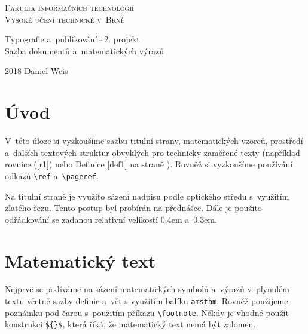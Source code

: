 \documentclass[a4paper, 11pt, twocolumn] {article}
\begin{document}
\begin{titlepage}
\begin{center}

\theoremstyle{definition}
\newtheorem{definition} {Definice}
\newtheorem{sentence}{Věta}



{\Huge \textsc{Fakulta informačních technologií\\[0.4em]
Vysoké učení technické v~Brně}}\\[0.3em]


{\LARGE
	Typografie a~publikování\,--\,2. projekt\\
	Sazba dokumentů a~matematických výrazů\\
}

\end{center}

{\LARGE 2018    \hfill     Daniel Weis}
\end{titlepage}


\section*{Úvod}
V~této úloze si vyzkoušíme sazbu titulní strany, matematic\-kých
vzorců, prostředí a~dalších textových struktur obvyklých
pro technicky zaměřené texty (například rovnice (\ref{r1})
nebo Definice \ref{def1} na straně \pageref{def1}). Rovněž si vyzkoušíme používání
odkazů \verb!\ref! a~\verb!\pageref!.

Na titulní straně je využito sázení nadpisu podle optického
středu s~využitím zlatého řezu. Tento postup byl
probírán na přednášce. Dále je použito odřádkování se
zadanou relativní velikostí 0.4em a~0.3em.


\section{Matematický text}

Nejprve se podíváme na sázení matematických symbolů
a~výrazů v~plynulém textu včetně sazby definic a~vět s využitím
balíku \texttt{amsthm}. Rovněž použijeme poznámku pod
čarou s~použitím příkazu \verb!\footnote!. Někdy je vhodné
použít konstrukci \verb!${}$!, která říká, že matematický text
nemá být zalomen.
\end{document}
